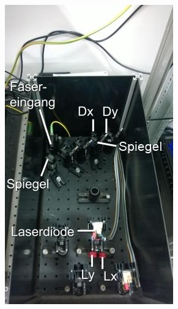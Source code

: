 

\begin{figure}
\begin{subfigure}[b]{0.5\linewidth}
\includegraphics[width=0.98\linewidth]{IMAGE/einkopplung.jpeg}
\label{fig:einkopplung}


\end{subfigure}
\end{figure}
